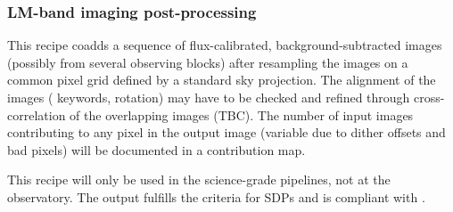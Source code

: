 \subsubsection{LM-band imaging post-processing}
\label{lm_img_postprocess}
\label{rec:lm_img_postprocess}
\label{sssec:lm_img_postprocess}

This recipe coadds a sequence of flux-calibrated,
background-subtracted images (possibly from several observing blocks)
after resampling the images on a common pixel grid defined by a
standard sky projection. The alignment of the images (
keywords, rotation) may have to be checked and refined through
cross-correlation of the overlapping images (TBC). The number of input
images contributing to any pixel in the output image (variable due to
dither offsets and bad pixels) will be documented in a contribution
map.

This recipe will only be used in the science-grade pipelines, not at
the observatory. The output fulfills the criteria for \ac{SDP}s and is compliant with .

